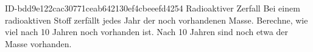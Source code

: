 \begin{exercise}
      {ID-bdd9e122cac30771ceab642130ef4cbeeefd4254}
      {Radioaktiver Zerfall}
  \ifproblem\problem
    Bei einem radioaktiven Stoff zerfällt jedes Jahr  der noch
    vorhandenen Masse. Berechne, wie viel nach 10 Jahren noch vorhanden
    ist.
  \fi
  \ifoutcome\outcome
    Nach 10 Jahren sind noch etwa  der Masse vorhanden.
  \fi
\end{exercise}
